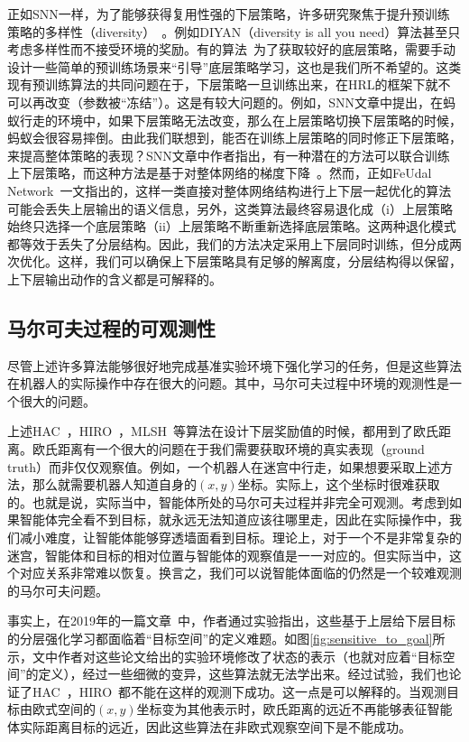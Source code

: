 正如SNN一样，为了能够获得复用性强的下层策略，许多研究聚焦于提升预训练策略的多样性（diversity）~\cite{DIYAN, Learning_and_Transfer_of_Modulated_Locomotor_Controllers}。例如DIYAN（diversity is all you need）算法甚至只考虑多样性而不接受环境的奖励。有的算法~\cite{Learning_and_Transfer_of_Modulated_Locomotor_Controllers}为了获取较好的底层策略，需要手动设计一些简单的预训练场景来``引导''底层策略学习，这也是我们所不希望的。这类现有预训练算法的共同问题在于，下层策略一旦训练出来，在HRL的框架下就不可以再改变（参数被``冻结''）。这是有较大问题的。例如，SNN文章中提出，在蚂蚁行走的环境中，如果下层策略无法改变，那么在上层策略切换下层策略的时候，蚂蚁会很容易摔倒。由此我们联想到，能否在训练上层策略的同时修正下层策略，来提高整体策略的表现？SNN文章中作者指出，有一种潜在的方法可以联合训练上下层策略，而这种方法是基于对整体网络的梯度下降~\cite{categorical_gradient}。然而，正如FeUdal Network~\cite{feudal}一文指出的，这样一类直接对整体网络结构进行上下层一起优化的算法可能会丢失上层输出的语义信息，另外，这类算法最终容易退化成（i）上层策略始终只选择一个底层策略（ii）上层策略不断重新选择底层策略。这两种退化模式都等效于丢失了分层结构。因此，我们的方法决定采用上下层同时训练，但分成两次优化。这样，我们可以确保上下层策略具有足够的解离度，分层结构得以保留，上下层输出动作的含义都是可解释的。

\subsection{马尔可夫过程的可观测性}
尽管上述许多算法能够很好地完成基准实验环境下强化学习的任务，但是这些算法在机器人的实际操作中存在很大的问题。其中，马尔可夫过程中环境的观测性是一个很大的问题。

上述HAC~\cite{HAC}，HIRO~\cite{HIRO}，MLSH~\cite{MLSH}等算法在设计下层奖励值的时候，都用到了欧氏距离。欧氏距离有一个很大的问题在于我们需要获取环境的真实表现（ground truth）而非仅仅观察值。例如，一个机器人在迷宫中行走，如果想要采取上述方法，那么就需要机器人知道自身的$(x, y)$坐标。实际上，这个坐标时很难获取的。也就是说，实际当中，智能体所处的马尔可夫过程并非完全可观测。考虑到如果智能体完全看不到目标，就永远无法知道应该往哪里走，因此在实际操作中，我们减小难度，让智能体能够穿透墙面看到目标。理论上，对于一个不是非常复杂的迷宫，智能体和目标的相对位置与智能体的观察值是一一对应的。但实际当中，这个对应关系非常难以恢复。换言之，我们可以说智能体面临的仍然是一个较难观测的马尔可夫问题。

事实上，在2019年的一篇文章~\cite{sensitive_to_goal_space}中，作者通过实验指出，这些基于上层给下层目标的分层强化学习都面临着``目标空间''的定义难题。如图\ref{fig:sensitive_to_goal}所示，文中作者对这些论文给出的实验环境修改了状态的表示（也就对应着``目标空间''的定义），经过一些细微的变异，这些算法就无法学出来。经过试验，我们也论证了HAC~\cite{HAC}，HIRO~\cite{HIRO}都不能在这样的观测下成功。这一点是可以解释的。当观测目标由欧式空间的$(x, y)$坐标变为其他表示时，欧氏距离的远近不再能够表征智能体实际距离目标的远近，因此这些算法在非欧式观察空间下是不能成功。

